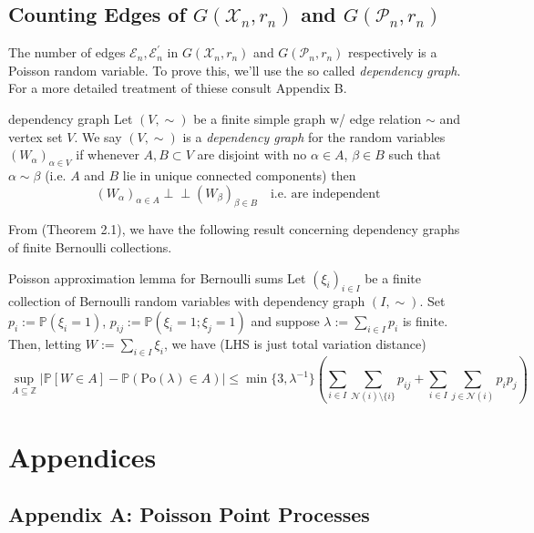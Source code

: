 \documentclass{article}
\newcommand{\indep}{\perp\!\!\!\!\perp}
\begin{document}
\subsection{Counting Edges of $G(\mathcal{X}_n, r_n)$ and $G(\mathcal{P}_n, r_n)$}

The number of edges $\mathcal{E}_n, \mathcal{E}_n^\prime$ in $G(\mathcal{X}_n, r_n)$ and $G(\mathcal{P}_n, r_n)$ respectively 
is a Poisson random variable. To prove this, we'll use the so called {\it dependency graph}. For a more detailed treatment 
of thiese consult Appendix B.  

\begin{definition}[]{dependency graph}
    Let $(V, \sim)$ be a finite simple graph w/ edge relation $\sim$ and vertex set $V$. We say $(V, \sim)$ is a 
    {\it dependency graph} for the random variables $(W_\alpha)_{\alpha \in V}$ if whenever $A, B \subset V$ are 
    disjoint with no $\alpha \in A$, $\beta \in B$ such that $\alpha \sim \beta$ (i.e. $A$ and $B$ lie in unique 
    connected components) then \[(W_\alpha)_{\alpha \in A} \indep (W_\beta)_{\beta \in B} \quad \text{i.e. are independent}\]
\end{definition}

From \cite{Penrose_2003} (Theorem 2.1), we have the following result concerning dependency graphs of finite 
Bernoulli collections.

\begin{lemma}[]{Poisson approximation lemma for Bernoulli sums}
    Let $(\xi_i)_{i \in I}$ be a finite collection of Bernoulli random variables with dependency graph $(I, \sim)$. 
    Set $p_i := \mathbb{P}(\xi_i = 1)$, $p_{ij} := \mathbb{P}(\xi_i = 1 ; \xi_j = 1)$ and suppose $\lambda := 
    \sum_{i \in I}p_i$ is finite. Then, letting $W := \sum_{i \in I}\xi_i$, we have (LHS is just total variation distance)
    \[\sup_{A \subseteq \mathbb{Z}} \bigg|\mathbb{P}[W \in A] - \mathbb{P}(\text{Po}(\lambda)\in A)\bigg| \leq 
    \min \{3, \lambda^{-1}\} \left(\sum_{i \in I}\sum_{\mathcal{N}(i) \setminus \{i\}}p_{ij} + 
    \sum_{i \in I}\sum_{j \in \mathcal{N}(i)}p_ip_j\right)\]
\end{lemma}

\newpage

\section{Appendices}

\subsection{Appendix A: Poisson Point Processes}
\end{document}
